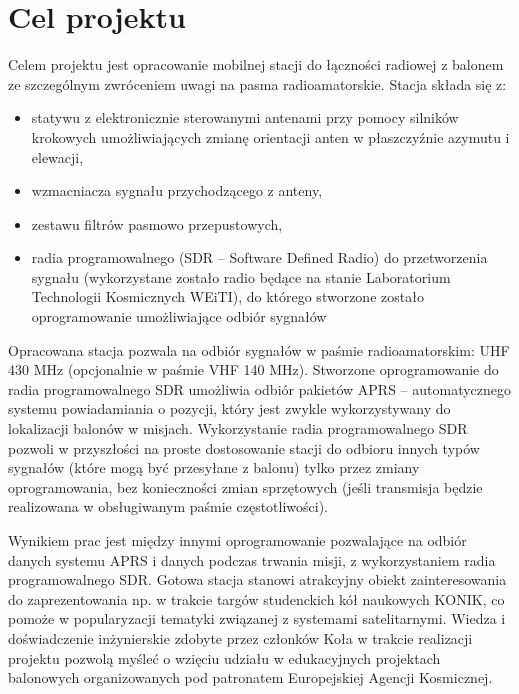 \section{Cel projektu}

Celem projektu jest opracowanie mobilnej stacji do łączności radiowej z balonem ze szczególnym zwróceniem uwagi na pasma radioamatorskie. Stacja składa się z:
\begin{itemize}
    \item statywu z elektronicznie sterowanymi antenami przy pomocy silników krokowych umożliwiających zmianę orientacji anten w płaszczyźnie azymutu i elewacji,
    \item wzmacniacza sygnału przychodzącego z anteny,
    \item zestawu filtrów pasmowo przepustowych,
    \item radia programowalnego (SDR – Software Defined Radio) do przetworzenia sygnału (wykorzystane zostało radio będące na stanie Laboratorium Technologii Kosmicznych WEiTI), do którego stworzone zostało oprogramowanie umożliwiające odbiór sygnałów
\end{itemize}  

	Opracowana stacja pozwala na odbiór sygnałów w paśmie radioamatorskim: UHF 430 MHz (opcjonalnie w paśmie VHF 140 MHz). 
	Stworzone oprogramowanie do radia programowalnego SDR umożliwia odbiór pakietów APRS – automatycznego systemu powiadamiania o pozycji, który jest zwykle wykorzystywany do lokalizacji balonów w misjach. Wykorzystanie radia programowalnego SDR pozwoli w przyszłości na proste dostosowanie stacji do odbioru innych typów sygnałów (które mogą być przesyłane z balonu) tylko przez zmiany oprogramowania, bez konieczności zmian sprzętowych (jeśli transmisja będzie realizowana w obsługiwanym paśmie częstotliwości).

	Wynikiem prac jest między innymi oprogramowanie pozwalające na odbiór danych systemu APRS i danych podczas trwania misji, z wykorzystaniem radia programowalnego SDR.
	Gotowa stacja stanowi atrakcyjny obiekt zainteresowania do zaprezentowania np. w trakcie targów studenckich kół naukowych KONIK, co pomoże w popularyzacji tematyki związanej z systemami satelitarnymi.
	Wiedza i doświadczenie inżynierskie  zdobyte przez członków Koła w trakcie realizacji projektu pozwolą myśleć o wzięciu udziału w edukacyjnych projektach balonowych organizowanych pod patronatem Europejskiej Agencji Kosmicznej.
